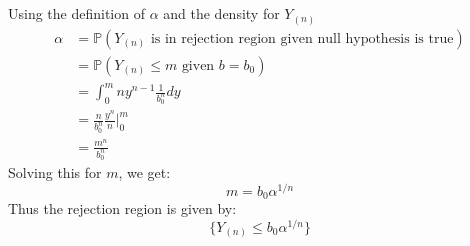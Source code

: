 \documentclass[12pt]{article}
\def\P{{\mathbb P}}
\begin{document}
\begin{enumerate}
Using the definition of $\alpha$ and the density for $Y_{(n)}$
\begin{align*}
\alpha &= \P(Y_{(n)} \text{ is in rejection region given null hypothesis is true}) \\
&= \P(Y_{(n)} \leq m \text{ given } b = b_0) \\
&= \int_0^m n y^{n-1} \frac{1}{b_0^n} dy \\
&= \frac{n}{b_0^n} \frac{y^n}{n}\Bigr|_0^m \\
&= \frac{m^n}{b_0^n}
\end{align*}
Solving this for $m$, we get:
\[
m = b_0 \alpha^{1/n}
\]
Thus the rejection region is given by:
\[
\{ Y_{(n)} \leq b_0 \alpha^{1/n} \}
\]
\end{enumerate}
\end{document}

